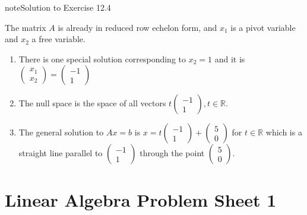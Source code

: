 \documentclass[letterpaper,10pt,english]{jupyterBook}
\begin{document}
\begin{sphinxadmonition}{note}{Solution to Exercise 12.4}



\sphinxAtStartPar
The matrix \(A\) is already in reduced row echelon form, and \(x_1\) is a pivot variable and \(x_2\) a free variable.
\begin{enumerate}
%
\item {} 
\sphinxAtStartPar
There is one special solution corresponding to \(x_2=1\) and it is \(\begin{pmatrix}x_1\\x_2\end{pmatrix}=\begin{pmatrix}-1\\1\end{pmatrix}\)

\item {} 
\sphinxAtStartPar
The null space is the space of all vectors \(t\begin{pmatrix}-1\\1\end{pmatrix}, t \in \mathbb{R}\).

\item {} 
\sphinxAtStartPar
The general solution to \(Ax = b\) is \(x = t\begin{pmatrix}-1\\1\end{pmatrix} + \begin{pmatrix}5\\0\end{pmatrix}\) for \(t \in \mathbb{R}\) which is a straight line parallel to \(\begin{pmatrix}-1\\1\end{pmatrix}\) through the point \(\begin{pmatrix}5\\0\end{pmatrix}\).

\end{enumerate}
\end{sphinxadmonition}


\chapter{Linear Algebra \sphinxhyphen{} Problem Sheet 1}
\label{\detokenize{LinearAlgebra/problems/problems_1:linear-algebra-problem-sheet-1}}\label{\detokenize{LinearAlgebra/problems/problems_1::doc}}
\end{document}
